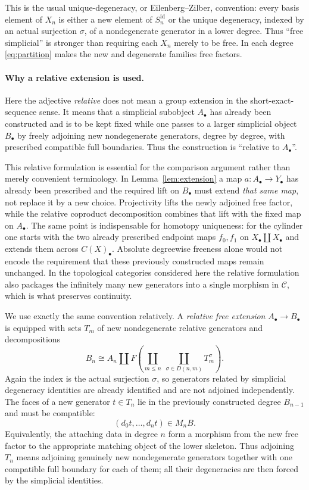 \documentclass[11pt,a4paper]{article}
\theoremstyle{definition}
\newcommand{\C}{\mathcal C}
\newcommand{\id}{\operatorname{id}}
\begin{document}
This is the usual unique-degeneracy, or Eilenberg--Zilber, convention:
every basis element of $X_n$ is either a new element of $S_n^{\id}$ or
the unique degeneracy, indexed by an actual surjection $\sigma$, of a
nondegenerate generator in a lower degree. Thus ``free simplicial'' is
stronger than requiring each $X_n$ merely to be free. In each degree
\eqref{eq:partition} makes the new and degenerate families free factors.

\paragraph{Why a relative extension is used.}
Here the adjective \emph{relative} does not mean a group extension in the
short-exact-sequence sense.  It means that a simplicial subobject
$A_\bullet$ has already been constructed and is to be kept fixed while one
passes to a larger simplicial object $B_\bullet$ by freely adjoining new
nondegenerate generators, degree by degree, with prescribed compatible
full boundaries.  Thus the construction is ``relative to $A_\bullet$''.

This relative formulation is essential for the comparison argument rather
than merely convenient terminology.  In Lemma~\ref{lem:extension} a map
$a:A_\bullet\to Y_\bullet$ has already been prescribed and the required
lift on $B_\bullet$ must extend \emph{that same map}, not replace it by a
new choice.  Projectivity lifts the newly adjoined free factor, while the
relative coproduct decomposition combines that lift with the fixed map on
$A_\bullet$.  The same point is indispensable for homotopy uniqueness:
for the cylinder one starts with the two already prescribed endpoint maps
$f_0,f_1$ on $X_\bullet\amalg X_\bullet$ and extends them across
$C(X)_\bullet$.  Absolute degreewise freeness alone would not encode the
requirement that these previously constructed maps remain unchanged.  In
the topological categories considered here the relative formulation also
packages the infinitely many new generators into a single morphism in
$\C$, which is what preserves continuity.

We use exactly the same convention relatively. A \emph{relative free
extension} $A_\bullet\to B_\bullet$ is equipped with sets $T_m$ of new
nondegenerate relative generators and decompositions
\[
 B_n\cong A_n\amalg
 F\left(\coprod_{m\leq n}\ \coprod_{\sigma\in D(n,m)}T_m^\sigma\right).
\]
Again the index is the actual surjection $\sigma$, so generators related
by simplicial degeneracy identities are already identified and are not
adjoined independently. The faces of a new generator $t\in T_n$ lie in
the previously constructed degree $B_{n-1}$ and must be compatible:
\[
 (d_0t,\ldots,d_nt)\in M_nB.
\]
Equivalently, the attaching data in degree $n$ form a morphism from the
new free factor to the appropriate matching object of the lower
skeleton. Thus adjoining $T_n$ means adjoining genuinely new
nondegenerate generators together with one compatible full boundary for
each of them; all their degeneracies are then forced by the simplicial
identities.
\end{document}
